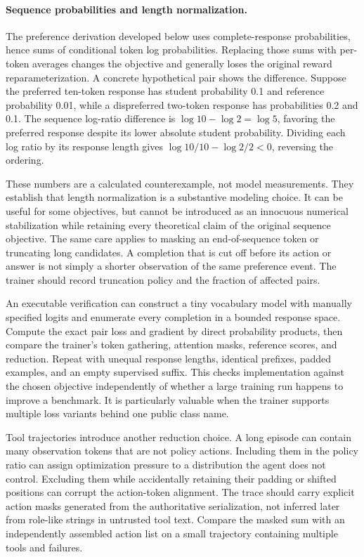 \paragraph{Sequence probabilities and length normalization.}
The preference derivation developed below uses complete-response probabilities, hence sums of conditional token log probabilities. Replacing those sums with per-token averages changes the objective and generally loses the original reward reparameterization. A concrete hypothetical pair shows the difference. Suppose the preferred ten-token response has student probability 0.1 and reference probability 0.01, while a dispreferred two-token response has probabilities 0.2 and 0.1. The sequence log-ratio difference is $\log 10-\log2=\log5$, favoring the preferred response despite its lower absolute student probability. Dividing each log ratio by its response length gives $\log10/10-\log2/2<0$, reversing the ordering.

These numbers are a calculated counterexample, not model measurements. They establish that length normalization is a substantive modeling choice. It can be useful for some objectives, but cannot be introduced as an innocuous numerical stabilization while retaining every theoretical claim of the original sequence objective. The same care applies to masking an end-of-sequence token or truncating long candidates. A completion that is cut off before its action or answer is not simply a shorter observation of the same preference event. The trainer should record truncation policy and the fraction of affected pairs.

An executable verification can construct a tiny vocabulary model with manually specified logits and enumerate every completion in a bounded response space. Compute the exact pair loss and gradient by direct probability products, then compare the trainer's token gathering, attention masks, reference scores, and reduction. Repeat with unequal response lengths, identical prefixes, padded examples, and an empty supervised suffix. This checks implementation against the chosen objective independently of whether a large training run happens to improve a benchmark. It is particularly valuable when the trainer supports multiple loss variants behind one public class name.

Tool trajectories introduce another reduction choice. A long episode can contain many observation tokens that are not policy actions. Including them in the policy ratio can assign optimization pressure to a distribution the agent does not control. Excluding them while accidentally retaining their padding or shifted positions can corrupt the action-token alignment. The trace should carry explicit action masks generated from the authoritative serialization, not inferred later from role-like strings in untrusted tool text. Compare the masked sum with an independently assembled action list on a small trajectory containing multiple tools and failures.

